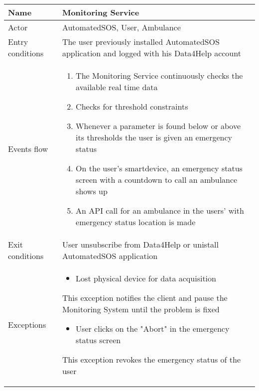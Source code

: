 \newpage
\begin{table}[h!]
\begin{tabular}{|l|p{12cm}|}
\hline
Name             & Monitoring Service \\ \hline
Actor            & AutomatedSOS, User, Ambulance \\ \hline
Entry conditions & The user previously installed AutomatedSOS application and logged with his Data4Help account\\ \hline
Events flow      & \begin{enumerate}
\item The Monitoring Service continuously checks the available real time data
\item Checks for threshold constraints
\item Whenever a parameter is found below or above its thresholds the user is given an emergency status
\item On the user's smartdevice, an emergency status screen with a countdown to call an ambulance shows up
\item An API call for an ambulance in the users' with emergency status location is made
\end{enumerate} \\ \hline
Exit conditions  & User unsubscribe from Data4Help or unistall AutomatedSOS application \\ \hline
Exceptions       &  \begin{itemize}
\item Lost physical device for data acquisition
\end{itemize} This exception notifies the client and pause the Monitoring System until the problem is fixed\begin{itemize}
\item User clicks on the "Abort" in the emergency status screen
\end{itemize} This exception revokes the emergency status of the user \\ \hline
\end{tabular}
\end{table}

